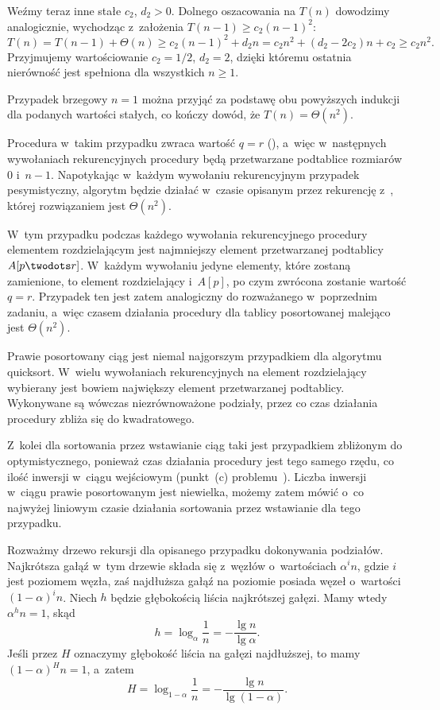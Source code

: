 Weźmy teraz inne stałe $c_2$, $d_2>0$. Dolnego oszacowania na $T(n)$ dowodzimy analogicznie, wychodząc z~założenia $T(n-1)\ge c_2(n-1)^2$:
\[
	T(n) = T(n-1)+\Theta(n) \ge c_2(n-1)^2+d_2n = c_2n^2+(d_2-2c_2)n+c_2 \ge c_2n^2.
\]
Przyjmujemy wartościowanie $c_2=1/2$, $d_2=2$, dzięki któremu ostatnia nierówność jest spełniona dla wszystkich $n\ge1$.

Przypadek brzegowy $n=1$ można przyjąć za podstawę obu powyższych indukcji dla podanych wartości stałych, co kończy dowód, że $T(n)=\Theta(n^2)$.

\exercise %
Procedura  w~takim przypadku zwraca wartość $q=r$ (), a~więc w~następnych wywołaniach rekurencyjnych procedury  będą przetwarzane podtablice rozmiarów 0 i~$n-1$. Napotykając w~każdym wywołaniu rekurencyjnym przypadek pesymistyczny, algorytm będzie działać w~czasie opisanym przez rekurencję z~, której rozwiązaniem jest $\Theta(n^2)$.

\exercise %
W~tym przypadku podczas każdego wywołania rekurencyjnego procedury  elementem rozdzielającym jest najmniejszy element przetwarzanej podtablicy $A[p\twodots r]$. W~każdym wywołaniu jedyne elementy, które zostaną zamienione, to element rozdzielający i~$A[p]$, po czym zwrócona zostanie wartość $q=r$. Przypadek ten jest zatem analogiczny do rozważanego w~poprzednim zadaniu, a~więc czasem działania procedury  dla tablicy posortowanej malejąco jest $\Theta(n^2)$.

\exercise %
Prawie posortowany ciąg jest niemal najgorszym przypadkiem dla algorytmu quicksort. W~wielu wywołaniach rekurencyjnych na element rozdzielający wybierany jest bowiem największy element przetwarzanej podtablicy. Wykonywane są wówczas niezrównoważone podziały, przez co czas działania procedury  zbliża się do kwadratowego.

Z~kolei dla sortowania przez wstawianie ciąg taki jest przypadkiem zbliżonym do optymistycznego, ponieważ czas działania procedury  jest tego samego rzędu, co ilość inwersji w~ciągu wejściowym (punkt~(c) problemu~). Liczba inwersji w~ciągu prawie posortowanym jest niewielka, możemy zatem mówić o~co najwyżej liniowym czasie działania sortowania przez wstawianie dla tego przypadku.

\exercise %
Rozważmy drzewo rekursji dla opisanego przypadku dokonywania podziałów. Najkrótsza gałąź w~tym drzewie składa się z~węzłów o~wartościach $\alpha^in$, gdzie $i$ jest poziomem węzła, zaś najdłuższa gałąź na  poziomie posiada węzeł o~wartości $(1-\alpha)^in$. Niech $h$ będzie głębokością liścia najkrótszej gałęzi. Mamy wtedy $\alpha^hn=1$, skąd
\[
	h = \log_\alpha\frac{1}{n} = -\frac{\lg n}{\lg\alpha}.
\]
Jeśli przez $H$ oznaczymy głębokość liścia na gałęzi najdłuższej, to mamy $(1-\alpha)^Hn=1$, a~zatem
\[
	H = \log_{1-\alpha}\frac{1}{n} = -\frac{\lg n}{\lg(1-\alpha)}.
\]

